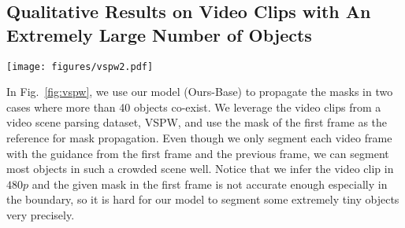 \documentclass[sigconf]{acmart}
\begin{document}
\subsection{Qualitative Results on Video Clips with An Extremely Large Number of Objects}
\begin{figure*}[t]
	\centering
	\texttt{[image: figures/vspw2.pdf]}
\caption{We show two cases with an extremely large number of target objects to be segmented, including \textit{1001\_3iEIq5HBY1s} with 44 objects (left) and \textit{1007\_YCTBBdbKSSg} with 43 objects (right), from a video scene parsing dataset, VSPW \cite{miao2021vspw}. Even if our model (Ours-Base) only leverages the guidance from the first and the previous frame, it can handle such cases with an extremely large number of objects well. Please zoom in on the figure to view it better.}
	\label{fig:vspw}
\end{figure*} In Fig.~\ref{fig:vspw}, we use our model (Ours-Base) to propagate the masks in two cases where more than 40 objects co-exist. We leverage the video clips from a video scene parsing dataset, VSPW\cite{miao2021vspw}, and use the mask of the first frame as the reference for mask propagation. Even though we only segment each video frame with the guidance from the first frame and the previous frame, we can segment most objects in such a crowded scene well. Notice that we infer the video clip in $480p$ and the given mask in the first frame is not accurate enough especially in the boundary, so it is hard for our model to segment some extremely tiny objects very precisely.
\end{document}
